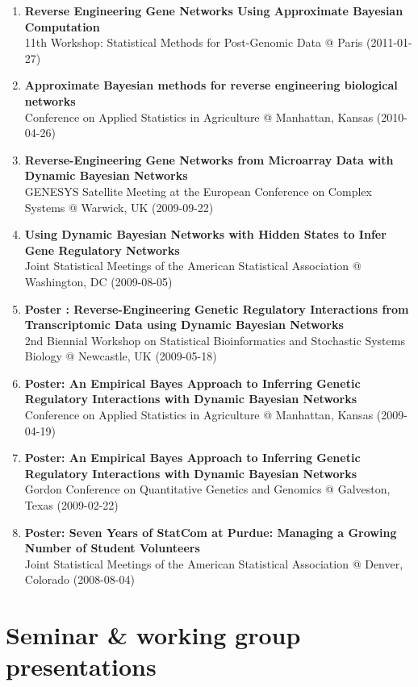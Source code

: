 \documentclass[11pt, a4paper]{awesome-cv}
\begin{document}
\begin{enumerate}
  (2012-01-26)
\item
  \textbf{Reverse Engineering Gene Networks Using Approximate Bayesian
  Computation}\\
  11th Workshop: Statistical Methods for Post-Genomic Data @ Paris
  (2011-01-27)
\item
  \textbf{Approximate Bayesian methods for reverse engineering
  biological networks}\\
  Conference on Applied Statistics in Agriculture @ Manhattan, Kansas
  (2010-04-26)
\item
  \textbf{Reverse-Engineering Gene Networks from Microarray Data with
  Dynamic Bayesian Networks}\\
  GENESYS Satellite Meeting at the European Conference on Complex
  Systems @ Warwick, UK (2009-09-22)
\item
  \textbf{Using Dynamic Bayesian Networks with Hidden States to Infer
  Gene Regulatory Networks}\\
  Joint Statistical Meetings of the American Statistical Association @
  Washington, DC (2009-08-05)
\item
  \textbf{Poster : Reverse-Engineering Genetic Regulatory Interactions
  from Transcriptomic Data using Dynamic Bayesian Networks}\\
  2nd Biennial Workshop on Statistical Bioinformatics and Stochastic
  Systems Biology @ Newcastle, UK (2009-05-18)
\item
  \textbf{Poster: An Empirical Bayes Approach to Inferring Genetic
  Regulatory Interactions with Dynamic Bayesian Networks}\\
  Conference on Applied Statistics in Agriculture @ Manhattan, Kansas
  (2009-04-19)
\item
  \textbf{Poster: An Empirical Bayes Approach to Inferring Genetic
  Regulatory Interactions with Dynamic Bayesian Networks}\\
  Gordon Conference on Quantitative Genetics and Genomics @ Galveston,
  Texas (2009-02-22)
\item
  \textbf{Poster: Seven Years of StatCom at Purdue: Managing a Growing
  Number of Student Volunteers}\\
  Joint Statistical Meetings of the American Statistical Association @
  Denver, Colorado (2008-08-04)
\end{enumerate}

\hypertarget{seminar-working-group-presentations}{%
\section{Seminar \& working group
presentations}\label{seminar-working-group-presentations}}
\end{document}
